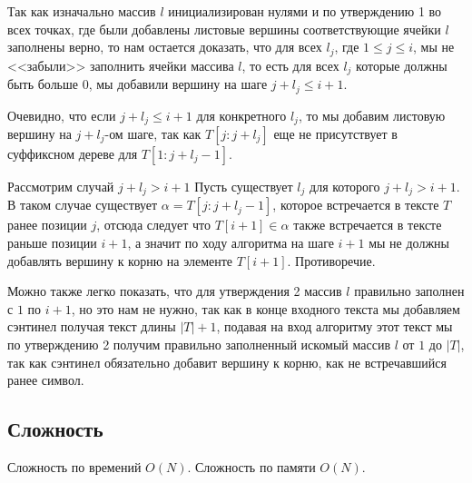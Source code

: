 \documentclass[12pt]{article}
\begin{document}
Так как изначально массив $ l $ инициализирован нулями и по
утверждению 1 во всех точках, где были добавлены листовые
вершины соответствующие ячейки $ l $ заполнены верно, то нам
остается доказать, что для всех $ l_j $, где $ 1 \le j \le i $,
мы не <<забыли>> заполнить ячейки массива $ l $, то есть для
всех $ l_j $ которые должны быть больше $ 0 $, мы добавили
вершину на шаге $ j + l_j \le i + 1 $.

Очевидно, что если $ j + l_j \le i + 1 $ для конкретного $ l_j $,
то мы добавим листовую вершину на $ j + l_j $-ом шаге, так как
$ T[j:j + l_j] $ еще не присутствует в суффиксном дереве для
$ T[1:j + l_j - 1] $.

Рассмотрим случай $ j + l_j > i + 1 $
Пусть существует $ l_j $ для которого $ j + l_j > i + 1 $. В
таком случае существует $ \alpha = T[j:j + l_j - 1] $, которое
встречается в тексте $ T $ ранее позиции $ j $, отсюда следует
что $ T[i + 1] \in \alpha $ также встречается в тексте раньше
позиции $ i + 1 $, а значит по ходу алгоритма на шаге $ i + 1 $
мы не должны добавлять вершину к корню на элементе $ T[i + 1] $.
Противоречие.

Можно также легко показать, что для утверждения 2 массив $ l $
правильно заполнен с $ 1 $ по $ i + 1 $, но это нам не нужно,
так как в конце входного текста мы добавляем сэнтинел получая
текст длины $ |T| + 1 $, подавая на вход алгоритму этот текст
мы по утверждению 2 получим правильно заполненный искомый массив
$ l $ от $ 1 $ до $ |T| $, так как сэнтинел обязательно добавит
вершину к корню, как не встречавшийся ранее символ.

\subsection{Сложность}
Сложность по времений $ O(N) $.
Сложность по памяти $ O(N) $.
\end{document}

